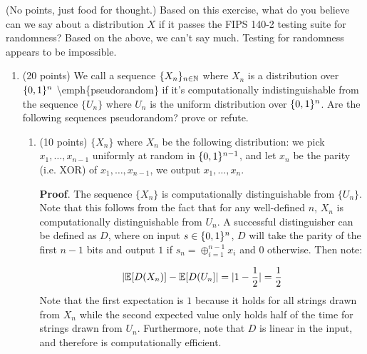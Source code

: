 \documentclass{article}
\begin{document}
\noindent{}(No points, just food for thought.) Based on this exercise, what do you believe can we say about a distribution $X$ if it passes the FIPS 140-2 testing suite for randomness?
Based on the above, we can't say much. Testing for randomness appears to be impossible.%

\begin{enumerate}[,start=2]%

\item{}
(20 points) We call a sequence $\{ X_n \}_{n\in\mathbb{N}}$ where $X_n$ is a distribution over $\{0,1\}^n$  \textbackslash{}emph\{pseudorandom\} if it's computationally indistinguishable from the sequence $\{ U_n \}$ where $U_n$ is the uniform distribution over $\{0,1\}^n$. Are the following sequences pseudorandom? prove or refute.%

\begin{enumerate}[noitemsep,topsep=\mdcompacttopsep,label=\alph*.]%

\item{}(10 points) $\{ X_n \}$ where  $X_n$ be the following distribution: we pick $x_1,\ldots,x_{n-1}$
uniformly at random in $\{0,1\}^{n-1}$, and let $x_n$ be the parity (i.e. XOR) of
$x_1,\ldots,x_{n-1}$, we output $x_1,\ldots, x_n$.

\begin{mdbmarginx}{1ex}{0pt}{1ex}{0pt}%
\noindent{}\textbf{Proof}.  The sequence $\{X_n\}$ is computationally distinguishable from $\{U_n\}$. Note that this follows from 
the fact that for any well-defined $n$, $X_n$ is computationally distinguishable from $U_n$. A successful distinguisher
can be defined as $D$, where on input $s \in \{0,1\}^n$, $D$ will take the parity of the first $n-1$ bits
and output $1$ if $s_n = \oplus_{i=1}^{n-1}x_i$ and $0$ otherwise. Then note:%
\end{mdbmarginx}%
\noindent\noindent\[%
|\E[D(X_n)] - \E[D(U_n]| = |1 - \frac{1}{2}| = \frac{1}{2}
\]%
Note that the first expectation is $1$ because it holds for all strings drawn from $X_n$ while the
second expected value only holds half of the time for strings drawn from $U_n$. Furthermore, note that
$D$ is linear in the input, and therefore is computationally efficient. 
\mdfloatright{\ensuremath{\Box}}%


\end{enumerate}
\end{enumerate}
\end{document}
